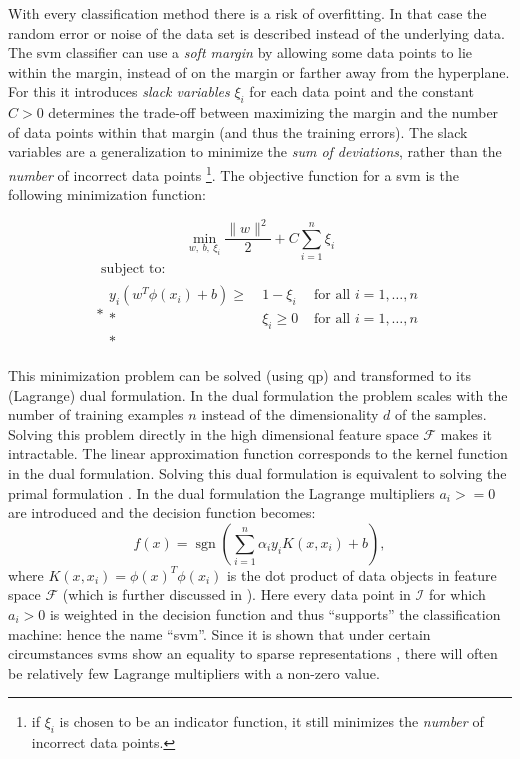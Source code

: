 With every classification method there is a risk of overfitting.
In that case the random error or noise of the data set is described instead of the underlying data.
The \gls{svm} classifier can use a \emph{soft margin} by allowing some data points to lie within the margin, instead of on the margin or farther away from the hyperplane.
For this it introduces \emph{slack variables} $\xi_i$ for each data point and the constant $C > 0$ determines the trade-off between maximizing the margin and the number of data points within that margin (and thus the training errors).
The slack variables are a generalization to minimize the \emph{sum of deviations}, rather than the \emph{number} of incorrect data points \cite{cherkassky2007learning}\footnote{if $\xi_i$ is chosen to be an indicator function, it still minimizes the \emph{number} of incorrect data points.}.
The objective function for a \gls{svm} is the following minimization function:

\begin{equation}\label{eq:svm_objective}
  \operatorname*{min}_{w,\ b,\ \xi_i} \frac{ \lVert{w}\rVert^2 }{2} + C \sum_{i=1}^n \xi_i
\end{equation}
\begin{equation}
  \begin{multlined}
  \mbox{ subject to: } \\*
  \begin{aligned}
  y_i( w^T \phi(x_i) + b) \geq \: & 1 - \xi_i & \mbox{ for all } i = 1, \dots, n \\*
   & \xi_i \geq 0 & \mbox{ for all } i = 1, \dots, n\\*
  \end{aligned}
  \end{multlined}
\end{equation}

This minimization problem can be solved (using \gls{qp}) and transformed to its (Lagrange) dual formulation.
In the dual formulation the problem scales with the number of training examples $n$ instead of the dimensionality $d$ of the samples.
Solving this problem directly in the high dimensional feature space $\mathcal{F}$ makes it intractable.
The linear approximation function corresponds to the kernel function in the dual formulation.
Solving this dual formulation is equivalent to solving the primal formulation \cite{cherkassky2007learning}.
In the dual formulation the Lagrange multipliers $a_i >= 0$ are introduced and the decision function becomes:
\begin{equation}\label{eq:svm_lagrange}
  f(x) = \operatorname{sgn}( \sum_{i=1}^n \alpha_i y_i K(x, x_i) + b),
\end{equation}
where $K(x, x_i) = \phi(x)^T\phi(x_i)$ is the dot product of data objects in feature space $\mathcal{F}$ (which is further discussed in ).
Here every data point in $\mathcal{I}$ for which $a_i > 0$ is weighted in the decision function and thus ``supports'' the classification machine: hence the name ``\acrlong{svm}''.
Since it is shown that under certain circumstances \glspl{svm} show an equality to sparse representations \cite{girosi1998equivalence,smola1998connection}, there will often be relatively few Lagrange multipliers with a non-zero value.

